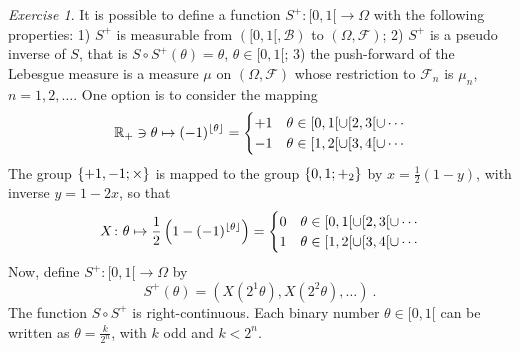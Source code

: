 \documentclass[12pt,a4paper]{amsart}
\DeclarePairedDelimiter\floor{\lfloor}{\rfloor}
\theoremstyle{plain}
\theoremstyle{definition}
\theoremstyle{remark}
\newtheorem{exercise}[theorem]{Exercise}
\begin{document}
\begin{exercise}
It is possible to define a function $S^+ \colon [0,1[ \to \Omega$ with
the following properties: 1) $S^+$ is measurable from $([0,1[ ,
\mathcal B)$ to $(\Omega,\mathcal F)$; 2) $S^+$ is a pseudo inverse of
$S$, that is $S \circ S^+(\theta) = \theta$, $\theta \in [0,1[$; 3) the push-forward of the Lebesgue measure is a measure $\mu$
on $(\Omega,\mathcal F)$ whose restriction to $\mathcal F_n$ is
$\mu_n$, $n=1,2,\dots$. One option is to consider the mapping
\begin{equation*}
  \reals_+ \ni \theta \mapsto (-1)^{\floor*{\theta}}
  =
  \begin{cases}
   +1 & \theta \in [0,1[ \cup [2,3[ \cup \cdots \\
   -1 & \theta \in [1,2[ \cup [3,4[ \cup \cdots
  \end{cases}
\end{equation*}
The group $\left\{+1,-1;\times\right\}$ is mapped to the group $\left\{0,1;+_2\right\}$
by $x = \frac12(1-y)$, with inverse $y = 1-2x$, so that
\begin{equation*}
 X \colon  \theta \mapsto \frac12\left(1 - (-1)^{\floor \theta}\right)
  =
  \begin{cases}
   0 & \theta \in [0,1[ \cup [2,3[ \cup \cdots \\
   1 & \theta \in [1,2[ \cup [3,4[ \cup \cdots
  \end{cases}
\end{equation*}
Now, define $S^+ \colon [0,1[ \to \Omega$ by  
\begin{equation*}
  S^+(\theta) = \left(X(2^1 \theta), X(2^2 \theta), \dots \right) \ .
\end{equation*}
The function $S\circ S^+$ is right-continuous. Each binary number
$\theta \in [0,1[$ can be written as $\theta = \frac k {2^n}$, with $k$ odd and
$k < 2^n$. 
\end{exercise}



\end{document}
